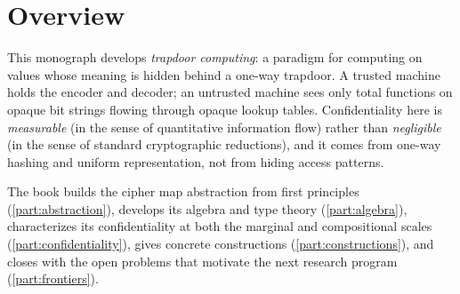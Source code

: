 \chapter{Overview}
\label{ch:overview}

\nocite{towell2026cipher,towell2026algebraic}

This monograph develops \emph{trapdoor computing}: a paradigm for
computing on values whose meaning is hidden behind a one-way trapdoor.
A trusted machine holds the encoder and decoder; an untrusted machine
sees only total functions on opaque bit strings flowing through opaque
lookup tables. Confidentiality here is \emph{measurable} (in the sense
of quantitative information flow) rather than \emph{negligible} (in the
sense of standard cryptographic reductions), and it comes from one-way
hashing and uniform representation, not from hiding access patterns.

The book builds the cipher map abstraction from first principles
(\cref{part:abstraction}), develops its algebra and type theory
(\cref{part:algebra}), characterizes its confidentiality at both the
marginal and compositional scales (\cref{part:confidentiality}), gives
concrete constructions (\cref{part:constructions}), and closes with the
open problems that motivate the next research program
(\cref{part:frontiers}).

